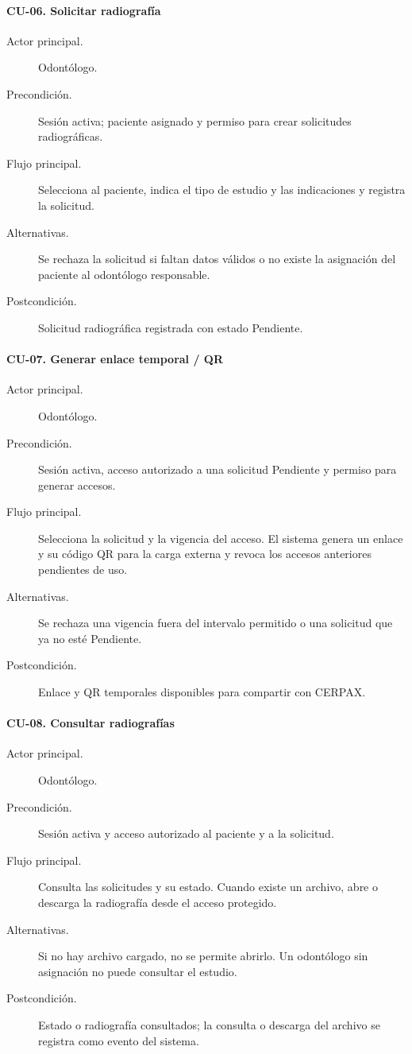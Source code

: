 \paragraph{CU-06. Solicitar radiografía}
\begin{description}

\item[Actor principal.] Odontólogo.
\item[Precondición.] Sesión activa; paciente asignado y permiso para crear solicitudes radiográficas.
\item[Flujo principal.] Selecciona al paciente, indica el tipo de estudio y las indicaciones y registra la solicitud.
\item[Alternativas.] Se rechaza la solicitud si faltan datos válidos o no existe la asignación del paciente al odontólogo responsable.
\item[Postcondición.] Solicitud radiográfica registrada con estado Pendiente.
\end{description}

\paragraph{CU-07. Generar enlace temporal / QR}
\begin{description}

\item[Actor principal.] Odontólogo.
\item[Precondición.] Sesión activa, acceso autorizado a una solicitud Pendiente y permiso para generar accesos.
\item[Flujo principal.] Selecciona la solicitud y la vigencia del acceso. El sistema genera un enlace y su código QR para la carga externa y revoca los accesos anteriores pendientes de uso.
\item[Alternativas.] Se rechaza una vigencia fuera del intervalo permitido o una solicitud que ya no esté Pendiente.
\item[Postcondición.] Enlace y QR temporales disponibles para compartir con CERPAX.
\end{description}

\paragraph{CU-08. Consultar radiografías}
\begin{description}

\item[Actor principal.] Odontólogo.
\item[Precondición.] Sesión activa y acceso autorizado al paciente y a la solicitud.
\item[Flujo principal.] Consulta las solicitudes y su estado. Cuando existe un archivo, abre o descarga la radiografía desde el acceso protegido.
\item[Alternativas.] Si no hay archivo cargado, no se permite abrirlo. Un odontólogo sin asignación no puede consultar el estudio.
\item[Postcondición.] Estado o radiografía consultados; la consulta o descarga del archivo se registra como evento del sistema.
\end{description}

